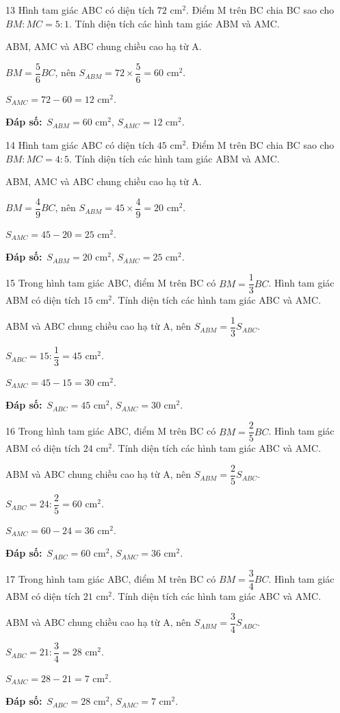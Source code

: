 \documentclass[11pt]{article}
\newif\ifsol \solfalse
\providecommand{\AnsWord}{Đáp số}
\newcommand{\dapso}[1]{\par\textbf{\AnsWord:}\ #1}
\newcommand{\probsol}[1]{%
  \begin{lrbox}{\solmeasure}\begin{minipage}{\dimexpr\linewidth-24pt\relax}#1\end{minipage}\end{lrbox}%
  \ifsol
    \begin{solbox}#1\end{solbox}%
  \else
    \setlength{\solht}{\dimexpr\ht\solmeasure+\dp\solmeasure+0.85cm\relax}%
    \ifdim\solht<1.35cm\setlength{\solht}{1.35cm}\fi
    \begin{tcolorbox}[colback=white,colframe=Line,boxrule=0.8pt,arc=5pt,
      left=8pt,right=8pt,top=4pt,bottom=4pt,height=\solht]{\footnotesize\color{Slate}\itshape\WorkWord}\end{tcolorbox}%
  \fi}
\newcommand{\gap}{\vspace{0.3cm}}
\def\WorkWord{Bài làm:}
\def\AnsWord{Đáp số}
\begin{document}
\gap
\begin{probbox}{13}{\relax}
Hình tam giác ABC có diện tích $72$ cm$^2$. Điểm M trên BC chia BC sao cho $BM:MC=5:1$. Tính diện tích các hình tam giác ABM và AMC.
\end{probbox}
\probsol{
ABM, AMC và ABC chung chiều cao hạ từ A.\par $BM=\dfrac{5}{6}BC$, nên $S_{ABM}=72\times\dfrac{5}{6}=60$ cm$^2$.\par $S_{AMC}=72-60=12$ cm$^2$.
\dapso{$S_{ABM}=60$ cm$^2$, $S_{AMC}=12$ cm$^2$.}}
\gap
\begin{probbox}{14}{\relax}
Hình tam giác ABC có diện tích $45$ cm$^2$. Điểm M trên BC chia BC sao cho $BM:MC=4:5$. Tính diện tích các hình tam giác ABM và AMC.
\end{probbox}
\probsol{
ABM, AMC và ABC chung chiều cao hạ từ A.\par $BM=\dfrac{4}{9}BC$, nên $S_{ABM}=45\times\dfrac{4}{9}=20$ cm$^2$.\par $S_{AMC}=45-20=25$ cm$^2$.
\dapso{$S_{ABM}=20$ cm$^2$, $S_{AMC}=25$ cm$^2$.}}
\gap
\begin{probbox}{15}{\relax}
Trong hình tam giác ABC, điểm M trên BC có $BM=\dfrac{1}{3}BC$. Hình tam giác ABM có diện tích $15$ cm$^2$. Tính diện tích các hình tam giác ABC và AMC.
\end{probbox}
\probsol{
ABM và ABC chung chiều cao hạ từ A, nên $S_{ABM}=\dfrac{1}{3}S_{ABC}$.\par $S_{ABC}=15:\dfrac{1}{3}=45$ cm$^2$.\par $S_{AMC}=45-15=30$ cm$^2$.
\dapso{$S_{ABC}=45$ cm$^2$, $S_{AMC}=30$ cm$^2$.}}
\gap
\begin{probbox}{16}{\relax}
Trong hình tam giác ABC, điểm M trên BC có $BM=\dfrac{2}{5}BC$. Hình tam giác ABM có diện tích $24$ cm$^2$. Tính diện tích các hình tam giác ABC và AMC.
\end{probbox}
\probsol{
ABM và ABC chung chiều cao hạ từ A, nên $S_{ABM}=\dfrac{2}{5}S_{ABC}$.\par $S_{ABC}=24:\dfrac{2}{5}=60$ cm$^2$.\par $S_{AMC}=60-24=36$ cm$^2$.
\dapso{$S_{ABC}=60$ cm$^2$, $S_{AMC}=36$ cm$^2$.}}
\gap
\begin{probbox}{17}{\relax}
Trong hình tam giác ABC, điểm M trên BC có $BM=\dfrac{3}{4}BC$. Hình tam giác ABM có diện tích $21$ cm$^2$. Tính diện tích các hình tam giác ABC và AMC.
\end{probbox}
\probsol{
ABM và ABC chung chiều cao hạ từ A, nên $S_{ABM}=\dfrac{3}{4}S_{ABC}$.\par $S_{ABC}=21:\dfrac{3}{4}=28$ cm$^2$.\par $S_{AMC}=28-21=7$ cm$^2$.
\dapso{$S_{ABC}=28$ cm$^2$, $S_{AMC}=7$ cm$^2$.}}
\end{document}
